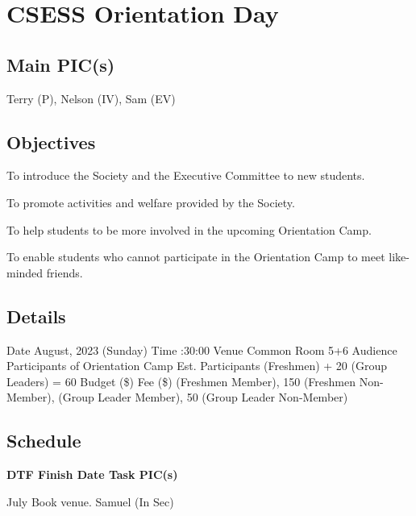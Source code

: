 \section{CSESS Orientation Day}

\subsection{Main PIC(s)}
Terry (P), Nelson (IV), Sam (EV)

\subsection{Objectives}
\startitemize
\item To introduce the Society and the Executive Committee to new students.
\item To promote activities and welfare provided by the Society.
\item To help students to be more involved in the upcoming Orientation Camp.
\item To enable students who cannot participate in the Orientation Camp to meet like-minded friends.
\stopitemize

\subsection{Details}
\starttabulate[|rB|l|]
\NC Date
 August, 2023 (Sunday) \NR
\NC Time
:30:00 \NR
\NC Venue
\NC Common Room 5+6 \NR
\NC Audience
\NC Participants of Orientation Camp \NR
\NC Est. Participants
 (Freshmen) + 20 (Group Leaders) = 60 \NR
\NC Budget (\$)
 \NR
\NC Fee (\$)
 (Freshmen Member), 150 (Freshmen Non-Member), \NR
\NC {} (Group Leader Member), 50 (Group Leader Non-Member) \NR
\stoptabulate

\subsection{Schedule}

\setupTABLE[c][1][width=0.75in]
\setupTABLE[c][2][width=1in]
\setupTABLE[c][3][width=3in]
\setupTABLE[c][4][width=1.25in]
\bTABLE
\bTABLEhead

\bTR\bTH    \bf{DTF}
\eTH\bTH    \bf{Finish Date}
\eTH\bTH    \bf{Task}
\eTH\bTH    \bf{PIC(s)}
\eTH\eTR

\eTABLEhead
\bTABLEbody

\bTR{}
\eTD{} July
\eTD\bTD Book venue.
\eTD\bTD Samuel (In Sec)
\eTD\eTR

